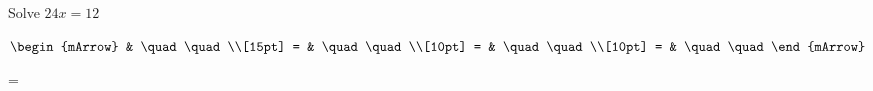 \begin{mtask}[resume]
\begin{exercise}
\begin{envSolution}
           \end{envSolution}
         \end{exercise}
   \task \begin{exercise} Solve $ 24x = 12 $
           \begin{envSolution}
             $\begin{mArrow} 
			       & \quad \quad              \\[15pt]
                 = & \quad \quad              \\[10pt]
		   		 = & \quad \quad              \\[10pt]
				 = & \quad \quad 
              \end{mArrow}$
            \begin{shortsolution}  
			     =$ \quad \quad \quad \quad$
			\end{shortsolution}				 
           \end{envSolution}
         \end{exercise}
\end{mtask}

